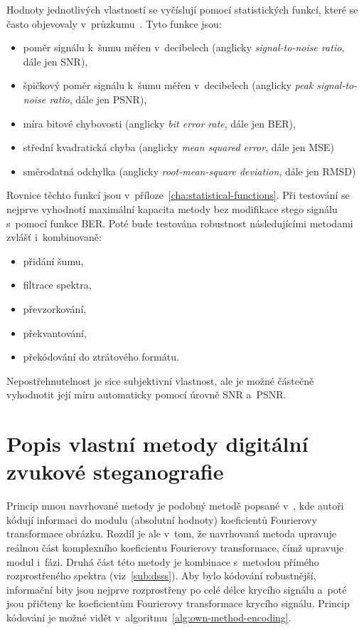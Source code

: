 Hodnoty jednotlivých vlastností se vyčíslují pomocí statistických funkcí, které
se často objevovaly v~průzkumu~\cite{AlSabhany2020}. Tyto funkce jsou:

\begin{itemize}
    \item poměr signálu k~šumu měřen v~decibelech (anglicky
        \textit{signal-to-noise ratio}, dále jen SNR),
    \item špičkový poměr signálu k~šumu měřen v~decibelech (anglicky
        \textit{peak signal-to-noise ratio}, dále jen PSNR),
    \item míra bitové chybovosti (anglicky \textit{bit error rate}, dále jen
        BER),
    \item střední kvadratická chyba (anglicky \textit{mean squared error}, dále
        jen MSE)
    \item směrodatná odchylka (anglicky \textit{root-mean-square deviation},
        dále jen RMSD)
\end{itemize}

Rovnice těchto funkcí jsou v~příloze~\ref{cha:statistical-functions}. Při
testování se nejprve vyhodnotí maximální kapacita metody bez modifikace stego
signálu s~pomocí funkce BER. Poté bude testována robustnost následujícími
metodami zvlášť i~kombinovaně:

\begin{itemize}
    \item přidání šumu,
    \item filtrace spektra,
    \item převzorkování,
    \item překvantování,
    \item překódování do ztrátového formátu.
\end{itemize}

Nepostřehnutelnost je sice subjektivní vlastnost, ale je možné částečně
vyhodnotit její míru automaticky pomocí úrovně SNR a~PSNR.

\section{Popis vlastní metody digitální zvukové steganografie}
\label{sec:own-method-proposal}

Princip mnou navrhované metody je podobný metodě popsané v~\cite{Ramkumar1999},
kde autoři kódují informaci do modulu (absolutní hodnoty) koeficientů
Fourierovy transformace obrázku. Rozdíl je ale v~tom, že navrhovaná metoda
upravuje reálnou část komplexního koeficientu Fourierovy transformace, čímž
upravuje modul i~fázi. Druhá část této metody je kombinace s~metodou přímého
rozprostřeného spektra (viz~\ref{sub:dsss}). Aby bylo kódování robustnější,
informační bity jsou nejprve rozprostřeny po celé délce krycího signálu a~poté
jsou přičteny ke koeficientům Fourierovy transformace krycího signálu. Princip
kódování je možné vidět v~algoritmu~\ref{alg:own-method-encoding}.

